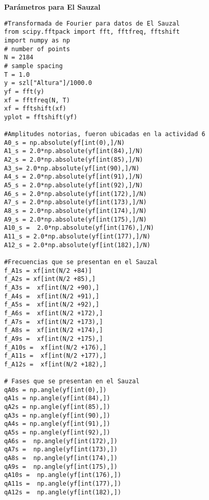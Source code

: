 \textbf{Parámetros para El Sauzal}
\begin{verbatim}
#Transformada de Fourier para datos de El Sauzal
from scipy.fftpack import fft, fftfreq, fftshift
import numpy as np
# number of points
N = 2184
# sample spacing
T = 1.0
y = szl["Altura"]/1000.0
yf = fft(y)
xf = fftfreq(N, T)
xf = fftshift(xf)
yplot = fftshift(yf)

#Amplitudes notorias, fueron ubicadas en la actividad 6
A0_s = np.absolute(yf[int(0),]/N)
A1_s = 2.0*np.absolute(yf[int(84),]/N)
A2_s = 2.0*np.absolute(yf[int(85),]/N)
A3_s= 2.0*np.absolute(yf[int(90),]/N)
A4_s = 2.0*np.absolute(yf[int(91),]/N)
A5_s = 2.0*np.absolute(yf[int(92),]/N)
A6_s = 2.0*np.absolute(yf[int(172),]/N)
A7_s = 2.0*np.absolute(yf[int(173),]/N)
A8_s = 2.0*np.absolute(yf[int(174),]/N)
A9_s = 2.0*np.absolute(yf[int(175),]/N)
A10_s =  2.0*np.absolute(yf[int(176),]/N)
A11_s = 2.0*np.absolute(yf[int(177),]/N)
A12_s = 2.0*np.absolute(yf[int(182),]/N)

#Frecuencias que se presentan en el Sauzal
f_A1s = xf[int(N/2 +84)]
f_A2s = xf[int(N/2 +85),]
f_A3s =  xf[int(N/2 +90),]
f_A4s =  xf[int(N/2 +91),]
f_A5s =  xf[int(N/2 +92),]
f_A6s =  xf[int(N/2 +172),]
f_A7s =  xf[int(N/2 +173),]
f_A8s =  xf[int(N/2 +174),]
f_A9s =  xf[int(N/2 +175),]
f_A10s =  xf[int(N/2 +176),]
f_A11s =  xf[int(N/2 +177),]
f_A12s =  xf[int(N/2 +182),]

# Fases que se presentan en el Sauzal
qA0s = np.angle(yf[int(0),])
qA1s = np.angle(yf[int(84),])
qA2s = np.angle(yf[int(85),])
qA3s = np.angle(yf[int(90),])
qA4s = np.angle(yf[int(91),])
qA5s = np.angle(yf[int(92),])
qA6s =  np.angle(yf[int(172),])
qA7s =  np.angle(yf[int(173),])
qA8s =  np.angle(yf[int(174),])
qA9s =  np.angle(yf[int(175),])
qA10s =  np.angle(yf[int(176),])
qA11s =  np.angle(yf[int(177),])
qA12s =  np.angle(yf[int(182),])
\end{verbatim}

